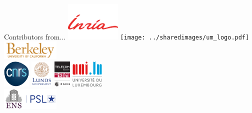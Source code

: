 \documentclass[unknownkeysallowed]{beamer}
\begin{document}
\begin{frame}{Contributors from...}
    \centering
    \includegraphics[width=100px]{../sharedimages/logo_inria_horiz.pdf} \hspace{1mm}
    \texttt{[image: ../sharedimages/um\_logo.pdf]} \hspace{1mm}
    \includegraphics[height=35px]{../sharedimages/logo_berkeley.png} \hspace{1mm}
    \\[7mm]
    \includegraphics[height=50px]{../sharedimages/logo_cnrs.pdf} \hspace{5mm}
    \includegraphics[height=50px]{../sharedimages/logo_lund} \hspace{5mm}
    \includegraphics[height=50px]{../sharedimages/logo_telecom.pdf} \hspace{5mm}
    \includegraphics[height=50px]{../sharedimages/logo_univ_luxembourg.pdf} \\[4mm]
    \includegraphics[height=40px]{../sharedimages/logo_ens.png}
\end{frame}
\end{document}
